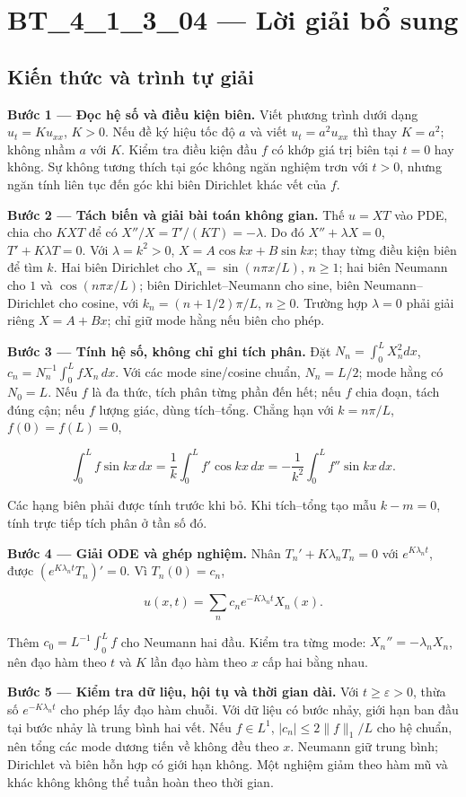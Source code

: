\documentclass[10pt,a4paper]{article}
\begin{document}
\section*{BT\_4\_1\_3\_04 — Lời giải bổ sung}
\subsection*{Kiến thức và trình tự giải}
\textbf{Bước 1 — Đọc hệ số và điều kiện biên.} Viết phương trình dưới dạng $u_t=Ku_{xx}$, $K>0$. Nếu đề ký hiệu tốc độ $a$ và viết $u_t=a^2u_{xx}$ thì thay $K=a^2$; không nhầm $a$ với $K$. Kiểm tra điều kiện đầu $f$ có khớp giá trị biên tại $t=0$ hay không. Sự không tương thích tại góc không ngăn nghiệm trơn với $t>0$, nhưng ngăn tính liên tục đến góc khi biên Dirichlet khác vết của $f$.

\textbf{Bước 2 — Tách biến và giải bài toán không gian.} Thế $u=XT$ vào PDE, chia cho $KXT$ để có $X''/X=T'/(KT)=-\lambda$. Do đó $X''+\lambda X=0$, $T'+K\lambda T=0$. Với $\lambda=k^2>0$, $X=A\cos kx+B\sin kx$; thay từng điều kiện biên để tìm $k$. Hai biên Dirichlet cho $X_n=\sin(n\pi x/L)$, $n\ge1$; hai biên Neumann cho $1$ và $\cos(n\pi x/L)$; biên Dirichlet–Neumann cho sine, biên Neumann–Dirichlet cho cosine, với $k_n=(n+1/2)\pi/L$, $n\ge0$. Trường hợp $\lambda=0$ phải giải riêng $X=A+Bx$; chỉ giữ mode hằng nếu biên cho phép.

\textbf{Bước 3 — Tính hệ số, không chỉ ghi tích phân.} Đặt $N_n=\int_0^L X_n^2dx$, $c_n=N_n^{-1}\int_0^L fX_n\,dx$. Với các mode sine/cosine chuẩn, $N_n=L/2$; mode hằng có $N_0=L$. Nếu $f$ là đa thức, tích phân từng phần đến hết; nếu $f$ chia đoạn, tách đúng cận; nếu $f$ lượng giác, dùng tích–tổng. Chẳng hạn với $k=n\pi/L$, $f(0)=f(L)=0$,


\[
\int_0^Lf\sin kx\,dx=\frac1k\int_0^Lf'\cos kx\,dx
=-\frac1{k^2}\int_0^Lf''\sin kx\,dx.
\]


Các hạng biên phải được tính trước khi bỏ. Khi tích–tổng tạo mẫu $k-m=0$, tính trực tiếp tích phân ở tần số đó.

\textbf{Bước 4 — Giải ODE và ghép nghiệm.} Nhân $T_n'+K\lambda_nT_n=0$ với $e^{K\lambda_nt}$, được $(e^{K\lambda_nt}T_n)'=0$. Vì $T_n(0)=c_n$,


\[
u(x,t)=\sum_n c_ne^{-K\lambda_nt}X_n(x).
\]


Thêm $c_0=L^{-1}\int_0^Lf$ cho Neumann hai đầu. Kiểm tra từng mode: $X_n''=-\lambda_nX_n$, nên đạo hàm theo $t$ và $K$ lần đạo hàm theo $x$ cấp hai bằng nhau.

\textbf{Bước 5 — Kiểm tra dữ liệu, hội tụ và thời gian dài.} Với $t\ge\varepsilon>0$, thừa số $e^{-K\lambda_nt}$ cho phép lấy đạo hàm chuỗi. Với dữ liệu có bước nhảy, giới hạn ban đầu tại bước nhảy là trung bình hai vết. Nếu $f\in L^1$, $|c_n|\le2\|f\|_1/L$ cho hệ chuẩn, nên tổng các mode dương tiến về không đều theo $x$. Neumann giữ trung bình; Dirichlet và biên hỗn hợp có giới hạn không. Một nghiệm giảm theo hàm mũ và khác không không thể tuần hoàn theo thời gian.
\end{document}
